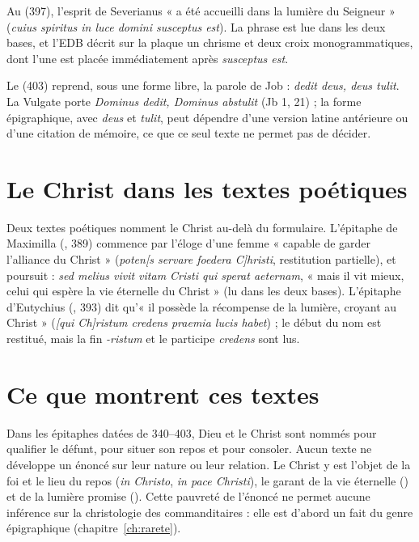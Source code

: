 Au  (397), l’esprit de Severianus « a été accueilli dans la lumière du Seigneur » (\emph{cuius spiritus in luce domini susceptus est}). La phrase est lue dans les deux bases, et l’EDB décrit sur la plaque un chrisme et deux croix monogrammatiques, dont l’une est placée immédiatement après \emph{susceptus est}.

Le  (403) reprend, sous une forme libre, la parole de Job : \emph{dedit deus, deus tulit}. La Vulgate porte \emph{Dominus dedit, Dominus abstulit} (Jb 1, 21) ; la forme épigraphique, avec \emph{deus} et \emph{tulit}, peut dépendre d’une version latine antérieure ou d’une citation de mémoire, ce que ce seul texte ne permet pas de décider.

\section{Le Christ dans les textes poétiques}

Deux textes poétiques nomment le Christ au-delà du formulaire. L’épitaphe de Maximilla (, 389) commence par l’éloge d’une femme « capable de garder l’alliance du Christ » (\emph{poten[s servare foedera C]hristi}, restitution partielle), et poursuit : \emph{sed melius vivit vitam Cristi qui sperat aeternam}, « mais il vit mieux, celui qui espère la vie éternelle du Christ » (lu dans les deux bases). L’épitaphe d’Eutychius (, 393) dit qu’« il possède la récompense de la lumière, croyant au Christ » (\emph{[qui Ch]ristum credens praemia lucis habet}) ; le début du nom est restitué, mais la fin \emph{-ristum} et le participe \emph{credens} sont lus.

\section{Ce que montrent ces textes}

Dans les épitaphes datées de 340–403, Dieu et le Christ sont nommés pour qualifier le défunt, pour situer son repos et pour consoler. Aucun texte ne développe un énoncé sur leur nature ou leur relation. Le Christ y est l’objet de la foi et le lieu du repos (\emph{in Christo}, \emph{in pace Christi}), le garant de la vie éternelle () et de la lumière promise (). Cette pauvreté de l’énoncé ne permet aucune inférence sur la christologie des commanditaires : elle est d’abord un fait du genre épigraphique (chapitre~\ref{ch:rarete}).
